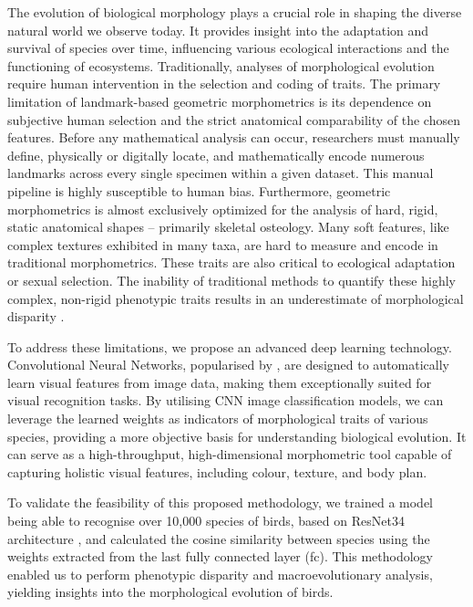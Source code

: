 \documentclass[pdflatex]{sn-jnl}
\begin{document}
The evolution of biological morphology plays a crucial role in shaping
the diverse natural world we observe today. It provides insight into
the adaptation and survival of species over time, influencing various
ecological interactions and the functioning of ecosystems.
Traditionally, analyses of morphological evolution require human intervention in
the selection and coding of traits. 
The primary limitation of landmark-based geometric morphometrics is its
dependence on subjective human selection and the strict anatomical comparability of the chosen features. 
Before any mathematical analysis can occur, researchers must manually define, physically or digitally locate, 
and mathematically encode numerous landmarks across every single specimen within a given dataset. 
This manual pipeline is highly susceptible to human bias.
Furthermore, geometric morphometrics is almost exclusively optimized for the analysis of hard, rigid, 
static anatomical shapes -- primarily skeletal osteology. Many soft features, like complex textures exhibited
in many taxa, are hard to measure and encode in traditional morphometrics. These traits are 
also critical to ecological adaptation or sexual selection. 
The inability of traditional methods to quantify these highly complex, non-rigid phenotypic traits 
results in an underestimate of morphological disparity \parencite{daboul2018procrustes, Guillerme2020Disparities, mulqueeney2025assessing}.

To address these limitations, we propose an advanced deep
learning technology. Convolutional Neural Networks, 
popularised by \textcite{LeCun1989Backpropagation},
are designed to automatically learn visual features from image data,
making them exceptionally suited for visual recognition tasks. By utilising
CNN image classification models, we can leverage the learned weights
as indicators of morphological traits of various species, providing a
more objective basis for understanding biological evolution.
It can serve as a high-throughput, high-dimensional
morphometric tool capable of capturing holistic visual features, including colour,
texture, and body plan. 

To validate the feasibility of this proposed methodology, 
we trained a model being able to recognise over 10,000
species of birds, based on ResNet34 architecture \parencite{He2016ResNet},
and calculated the cosine similarity between species using the weights
extracted from the last fully connected layer (fc). This methodology
enabled us to perform phenotypic disparity and macroevolutionary analysis,
yielding insights into the morphological evolution of birds.
\end{document}
